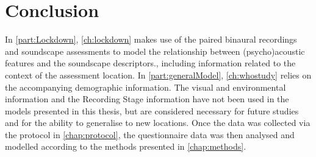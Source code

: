 
\section{Conclusion}

In \cref{part:Lockdown}, \cref{ch:lockdown} makes use of the paired binaural recordings and soundscape assessments to model the relationship between (psycho)acoustic features and the soundscape descriptors., including information related to the context of the assessment location. In \cref{part:generalModel}, \cref{ch:whostudy} relies on the accompanying demographic information. The visual and environmental information and the Recording Stage information have not been used in the models presented in this thesis, but are considered necessary for future studies and for the ability to generalise to new locations. Once the data was collected via the protocol in \cref{chap:protocol}, the questionnaire data was then analysed and modelled according to the methods presented in \cref{chap:methods}.